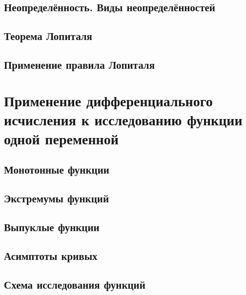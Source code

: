 \subsection{Неопределённость. Виды неопределённостей}

\subsection{Теорема Лопиталя}
%
\subsection{Применение правила Лопиталя}

\section{Применение дифференциального исчисления к исследованию функции одной переменной}
\subsection{Монотонные функции}

\subsection{Экстремумы функций} 

\subsection{Выпуклые функции}
\subsection{Асимптоты кривых}
\subsection{Схема исследования функций}


